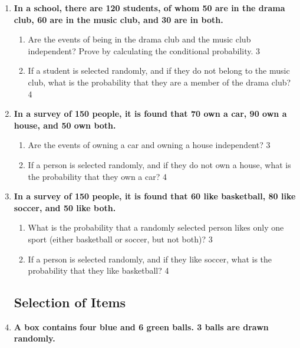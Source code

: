\documentclass[a4paper,oneside, margin=1.4in]{book}
\begin{document}
\begin{enumerate}
  \item  
  \textbf{In a school, there are 120 students, of whom 50 are in the drama club, 60 are in the music club, and 30 are in both.}  

  \begin{enumerate}  
    \item  
    	Are the events of being in the drama club and the music club independent? Prove by calculating the conditional probability. \hfill 3  
    \item  
    	If a student is selected randomly, and if they do not belong to the music club, what is the probability that they are a member of the drama club? \hfill 4  
  \end{enumerate}  

\item  
  \textbf{In a survey of 150 people, it is found that 70 own a car, 90 own a house, and 50 own both.}  

  \begin{enumerate}  
    \item  
    	Are the events of owning a car and owning a house independent?  \hfill 3  
    \item  
    	If a person is selected randomly, and if they do not own a house, what is the probability that they own a car? \hfill 4  
  \end{enumerate}  
  
  \item  
  \textbf{In a survey of 150 people, it is found that 60 like basketball, 80 like soccer, and 50 like both.}  

  \begin{enumerate}  
    \item  
    	What is the probability that a randomly selected person likes only one sport (either basketball or soccer, but not both)? \hfill 3  
    \item  
    	If a person is selected randomly, and if they like soccer, what is the probability that they like basketball? \hfill 4  
  \end{enumerate}  


\subsection{Selection of Items}

 \item
	  \textbf{A box contains four blue and 6 green balls. 3 balls are drawn randomly.} 
  

\end{enumerate}
\end{document}
